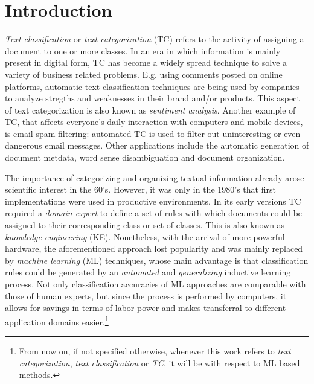 
\chapter{Introduction}
\label{ch:Introduction}
\textit{Text classification} or \textit{text categorization } (TC) refers to the
activity of assigning a document to one or more classes.
In an era in which information is mainly present in digital form, TC has
become a widely spread technique to solve a variety of business related problems. 
E.g. using comments posted on online platforms, automatic
text classification techniques are being used by companies to analyze stregths 
and weaknesses in their brand and/or products. This aspect of text categorization 
is also known as \textit{sentiment analysis}. Another example of TC, that
affects everyone's daily interaction with computers and mobile devices, is
email-spam filtering: automated TC is used to filter out
uninteresting or even dangerous email messages. Other applications include the
automatic generation of document metdata, word sense disambiguation and document 
organization.

The importance of categorizing and organizing textual information already
arose scientific interest in the 60's. However, it was only in the 1980's that
first implementations were used in productive environments. 
In its early versions TC required a \textit{domain expert} to define a set of
rules with which documents could be assigned to their corresponding class or set
of classes. This is also known as \textit{knowledge engineering} (KE).
Nonetheless, with the arrival of more powerful hardware, the aforementioned
approach lost popularity and was mainly replaced by \textit{machine learning} (ML)
techniques, whose main advantage is that classification rules could be generated
by an \textit{automated} and \emph{generalizing} inductive learning process. Not
only classification accuracies of ML approaches are comparable with those of human experts, 
but since the process is performed by computers, it allows for savings
in terms of labor power and makes transferral to different application domains
easier.\footnote{From now on, if not specified otherwise, whenever this work
refers to \textit{text categorization}, \textit{text classification} or \textit{TC}, it
will be with respect to ML based methods.}


